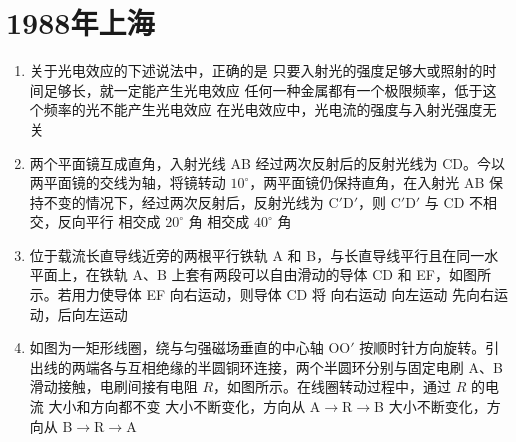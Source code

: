 \documentclass[\gkver]{gaokaozhenti}
\begin{document}
\chapter{1988年上海}

\begin{enumerate}
\item
关于光电效应的下述说法中，正确的是
{只要入射光的强度足够大或照射的时间足够长，就一定能产生光电效应}
{任何一种金属都有一个极限频率，低于这个频率的光不能产生光电效应}
{在光电效应中，光电流的强度与入射光强度无关}

\item
两个平面镜互成直角，入射光线 AB 经过两次反射后的反射光线为 CD。今以两平面镜的交线为轴，将镜转动 $10^{\circ}$，两平面镜仍保持直角，在入射光 AB 保持不变的情况下，经过两次反射后，反射光线为 C$'$D$'$，则 C$'$D$'$ 与 CD
\onepicture[h=4.05cm]{}
{不相交，反向平行}
{相交成 $20^{\circ}$ 角}
{相交成 $40^{\circ}$ 角}

\item
位于载流长直导线近旁的两根平行铁轨 A 和 B，与长直导线平行且在同一水平面上，在铁轨 A、B 上套有两段可以自由滑动的导体 CD 和 EF，如图所示。若用力使导体 EF 向右运动，则导体 CD 将
\onepicture[w=5.77cm]{}
{向右运动}
{向左运动}
{先向右运动，后向左运动}

\item
如图为一矩形线圈，绕与匀强磁场垂直的中心轴 OO$'$ 按顺时针方向旋转。引出线的两端各与互相绝缘的半圆铜环连接，两个半圆环分别与固定电刷 A、B 滑动接触，电刷间接有电阻 $R$，如图所示。在线圈转动过程中，通过 $R$ 的电流
\onepicture[w=5.07cm]{}
{大小和方向都不变}
{大小不断变化，方向从 A$\to$R$\to$B}
{大小不断变化，方向从 B$\to$R$\to$A}


\end{enumerate}
\end{document}
